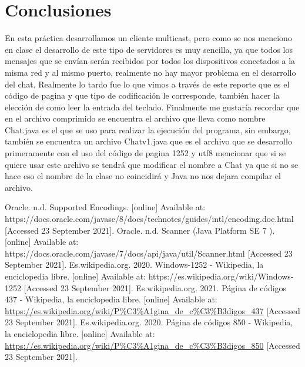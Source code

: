 \documentclass[11pt]{article}
\begin{document}
	\section{Conclusiones}
	En esta práctica desarrollamos un cliente multicast, pero como se nos menciono en clase el desarrollo de este tipo de servidores es muy sencilla, ya que todos los mensajes que se envían serán recibidos por todos los dispositivos conectados a la misma red y al mismo puerto, realmente no hay mayor problema en el desarrollo del chat. Realmente lo tardo fue lo que vimos a través de este reporte que es el código de pagina y que tipo de codificación le corresponde, también hacer la elección de como leer la entrada del teclado. Finalmente me gustaría recordar que en el archivo comprimido se encuentra el archivo que lleva como nombre Chat.java es el que se uso para realizar la ejecución del programa, sin embargo, también se encuentra un archivo Chatv1.java que es el archivo que se desarrollo primeramente con el uso del código de pagina 1252 y utf8 mencionar que si se quiere usar este archivo se tendrá que modificar el nombre a Chat ya que si no se hace eso el nombre de la clase no coincidirá y Java no nos dejara compilar el archivo.
	\begin{thebibliography}{1}
  Oracle. n.d. Supported Encodings. [online] Available at: https://docs.oracle.com/javase/8/docs/technotes/guides/intl/encoding.doc.html [Accessed 23 September 2021].
   Oracle. n.d. Scanner (Java Platform SE 7 ). [online] Available at: https://docs.oracle.com/javase/7/docs/api/java/util/Scanner.html [Accessed 23 September 2021].
   Es.wikipedia.org. 2020. Windows-1252 - Wikipedia, la enciclopedia libre. [online] Available at: https://es.wikipedia.org/wiki/Windows-1252 [Accessed 23 September 2021].
   Es.wikipedia.org. 2021. Página de códigos 437 - Wikipedia, la enciclopedia libre. [online] Available at: \url{https://es.wikipedia.org/wiki/P\%C3\%A1gina_de_c\%C3\%B3digos_437} [Accessed 23 September 2021].
   Es.wikipedia.org. 2020. Página de códigos 850 - Wikipedia, la enciclopedia libre. [online] Available at: \url{https://es.wikipedia.org/wiki/P\%C3\%A1gina_de_c\%C3\%B3digos_850} [Accessed 23 September 2021].
\end{thebibliography}
\end{document}
